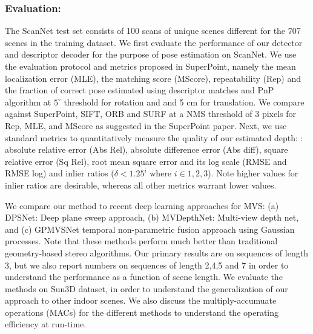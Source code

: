 \documentclass[runningheads]{llncs}
\begin{document}
\subsubsection{Evaluation:} The ScanNet test set consists of 100 scans of unique scenes different for the 707 scenes in the training dataset. We first evaluate the performance of our detector and descriptor decoder for the purpose of pose estimation on ScanNet. We use the evaluation protocol and metrics proposed in SuperPoint, namely the mean localization error (MLE), the matching score (MScore), repeatability (Rep) and the fraction of correct pose estimated using descriptor matches and PnP algorithm at $5^{\circ}$ threshold for rotation and and 5 cm for translation. We compare against SuperPoint, SIFT, ORB and SURF at a NMS threshold of 3 pixels for Rep, MLE, and MScore as suggested in the SuperPoint paper.
Next, we use standard metrics to quantitatively measure the quality of our estimated depth: : absolute relative error (Abs Rel), absolute difference error (Abs diff), square relative error (Sq Rel), root mean square error and its log scale (RMSE and RMSE log) and inlier ratios ($\delta < 1.25^i$ where $i \in {1, 2, 3}$). Note higher values for inlier ratios are desirable, whereas all other metrics warrant lower values. 

We compare our method to recent deep learning approaches for MVS: (a) DPSNet: Deep plane sweep approach, (b) MVDepthNet: Multi-view depth net, and (c) GPMVSNet temporal non-parametric fusion approach using Gaussian processes. Note that these methods perform much better than traditional geometry-based stereo algorithms. Our primary results are on sequences of length 3, but we also report numbers on sequences of length 2,4,5 and 7 in order to understand the performance as a function of scene length. We evaluate the methods on Sun3D dataset, in order to understand the generalization of our approach to other indoor scenes. We also discuss the multiply-accumuate operations (MACs) for the different methods to understand the operating efficiency at run-time. 
\end{document}
